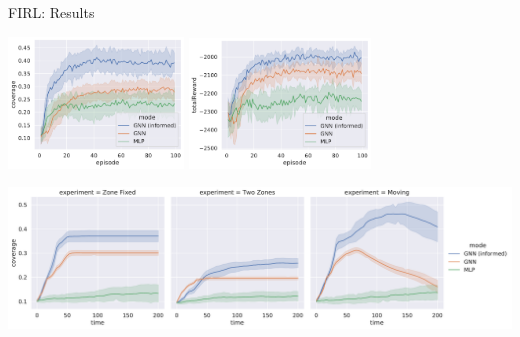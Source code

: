 \documentclass[presentation, 9pt,169]{beamer}\mode<presentation>{\usetheme{AMSBolognaFC}}
\begin{document}
\begin{frame}[allowframebreaks]{FIRL: Results}
  
\begin{center}
  \includegraphics[width=0.35\textwidth]{img/coverage-in-time.pdf}
  \includegraphics[width=0.36\textwidth]{img/reward-in-time.pdf}
\end{center}
\begin{center}
  \end{center}
\includegraphics[width=\textwidth]{img/coverage-test.pdf}

\end{frame}
\end{document}
